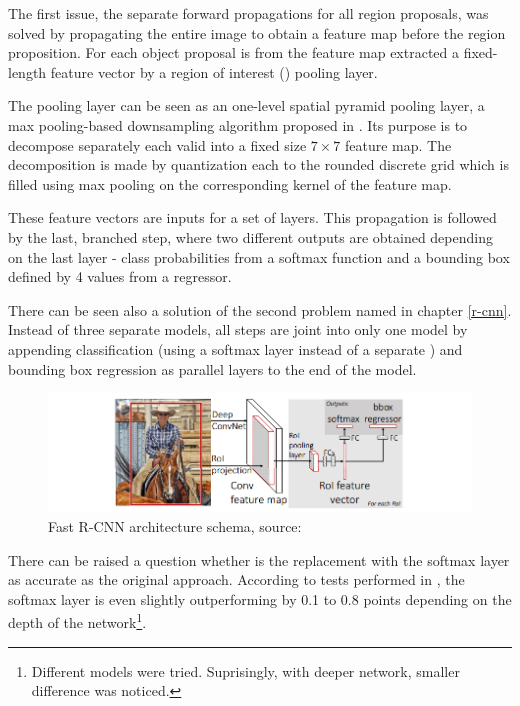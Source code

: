 The first issue, the separate forward propagations for all region proposals, was 
solved by propagating the entire image to obtain a feature map before the region 
proposition. For each object proposal is from the feature map extracted a 
fixed-length feature vector by a region of interest () pooling layer.

The  pooling layer can be seen as an one-level spatial pyramid pooling 
layer, a max pooling-based downsampling algorithm proposed in \cite{spp}. Its 
purpose is to decompose separately each valid  into a fixed size $7 
\times 7$ feature map. The decomposition is made by quantization each  
to the rounded discrete grid which is filled using max pooling on the 
corresponding kernel of the feature map.

These feature vectors are inputs for a set of  layers. This propagation 
is followed by the last, branched step, where two different outputs are obtained 
depending on the last layer - class probabilities from a softmax function and a 
bounding box defined by 4 values from a regressor.

There can be seen also a solution of the second problem named in chapter 
\ref{r-cnn}. Instead of three separate models, all steps are joint into only one 
model by appending classification (using a softmax layer instead of a separate 
) and bounding box regression as parallel layers to the end of the 
model.

\begin{figure}[H]
   \centering
	\includegraphics[width=.9\linewidth]{./pictures/fastrcnn.png}
	\caption[Fast R-CNN architecture]{Fast R-CNN architecture schema, source: 
\cite{fast-rcnn}}
      \label{fig:fast-rcnn}
\end{figure}

There can be raised a question whether is the  replacement with the 
softmax layer as accurate as the original approach. According to tests performed 
in \cite{fast-rcnn}, the softmax layer is even slightly outperforming  
by 0.1 to 0.8  points depending on the depth of the 
network\footnote{Different models were tried. Suprisingly, with deeper network, 
smaller  difference was noticed.}.

